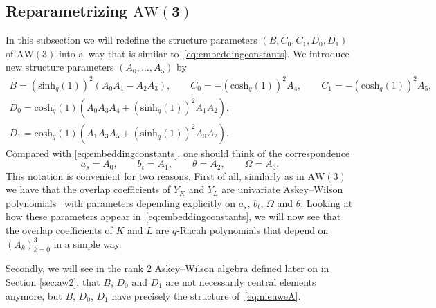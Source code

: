 \documentclass[10pt,a4paper]{amsart}
\numberwithin{equation}{section}
\newcommand{\aw}{\mathrm{AW}\!\left(3\right)}
\newcommand{\bivariateawalgebra}{rank 2 Askey--Wilson algebra }
\newcommand{\chq}{\mathrm{cosh}_q}
\newcommand{\shq}{\mathrm{sinh}_q}
\begin{document}
\subsection[Reparametrizing AW(3)]{Reparametrizing $\boldsymbol{\aw}$}\label{sec:herdefAW}
In this subsection we will redefine the structure parameters $(B,C_0,C_1,D_0,D_1)$ of $\aw$ into a~way that is similar to~\eqref{eq:embeddingconstants}. We introduce new structure parameters $(A_0,\dots ,A_5)$ by
\begin{gather}
		B= (\shq(1))^2(A_0A_1 - A_2A_3),\qquad C_0=-(\chq(1))^2A_4,\qquad C_1=-(\chq(1))^2A_5,\nonumber\\
		D_0=\chq(1)(A_0A_3A_4+(\shq(1))^2A_1A_2), \nonumber\\
		D_1=\chq(1) (A_1A_3A_5+(\shq(1))^2A_0A_2).
\label{eq:nieuweA}
\end{gather}
Compared with \eqref{eq:embeddingconstants}, one should think of the correspondence
\[
a_s=A_0,\qquad b_t=A_1,\qquad \theta=A_2,\qquad \Omega=A_3.
\]
This notation is convenient for two reasons. First of all, similarly as in $\aw$ we have that the overlap coefficients of $Y_{K}$ and $Y_{L}$ are univariate Askey--Wilson polynomials~\cite{Groenevelt2021} with parameters depending explicitly on $a_s$, $b_t$, $\Omega$ and $\theta$. Looking at how these parameters appear in~\eqref{eq:embeddingconstants}, we will now see that the overlap coefficients of $K$ and $L$ are $q$-Racah polynomials that depend on $(A_k)_{k=0}^3$ in a simple way.

Secondly, we will see in the \bivariateawalgebra defined later on in Section \ref{sec:aw2}, that $B$, $D_0$ and $D_1$ are not necessarily central elements anymore, but $B$, $D_0$, $D_1$ have precisely the structure of~\eqref{eq:nieuweA}.
\end{document}
